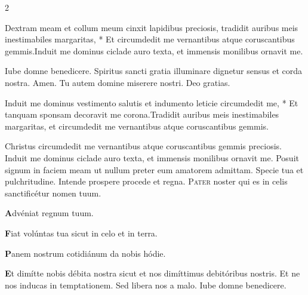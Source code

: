 \begin{multicols}{2}
\begin{responsory}
{Dextram meam et collum meum cinxit lapidibus preciosis, tradidit auribus meis inestimabiles margaritas, * Et circumdedit me vernantibus atque coruscantibus gemmis.}{Induit me dominus ciclade auro texta, et immensis monilibus ornavit me.}
\end{responsory}%
\newline {} Iube domne benedicere.
\newline {} Spiritus sancti gratia illuminare dignetur sensus et corda nostra. \R Amen. 
\newline {} Tu autem domine miserere nostri. \R Deo gratias.
\begin{responsory-doxology}
{Induit me dominus vestimento salutis et indumento leticie circumdedit me, * Et tanquam sponsam decoravit me corona.}{Tradidit auribus meis inestimabiles margaritas, et circumdedit me vernantibus atque coruscantibus gemmis.}
\end{responsory-doxology}%
\newline {}
\newline {} Christus circumdedit me vernantibus atque coruscantibus gemmis preciosis.
\newline {} Induit me dominus ciclade auro texta, et immensis monilibus ornavit me.
\newline {} Posuit signum in faciem meam ut nullum preter eum amatorem admittam.
\newline \V Specie tua et pulchritudine. \R Intende prospere procede et regna. 
\lettrine[lines=2]{\zallmancaps \color{Red} P}{ater} noster qui es in celis sanctificétur nomen tuum.
\begingroup
\setlength{\parindent}{.25em}
\par {\bfseries \color{Blue} A}dvéniat regnum tuum.
\par {\bfseries \color{Red} F}iat volúntas tua sicut in celo et in terra.
\par {\bfseries \color{Blue} P}anem nostrum cotidiánum da nobis hódie.
\par {\bfseries \color{Red} E}t dimítte nobis débita nostra sicut et nos dimíttimus debitóribus nostris.
\aftergroup\clearparshape%
\endgroup
\newline {} Et ne nos inducas in temptationem. \R Sed libera nos a malo.
\newline {} Iube domne benedicere.

\end{multicols}
